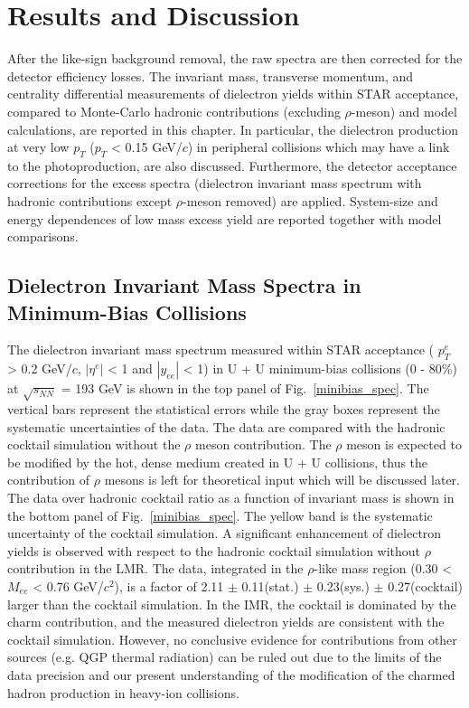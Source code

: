 ﻿\chapter{Results and Discussion}
\label{chap:result}

After the like-sign background removal, the raw spectra are then corrected for the detector efficiency losses. The invariant mass, transverse momentum, and centrality differential measurements of dielectron yields within STAR acceptance, compared to Monte-Carlo hadronic contributions (excluding $\rho$-meson) and model calculations, are reported in this chapter. In particular, the dielectron production at very low $p_{T}$ ($p_{T}$ < 0.15 GeV/$c$) in peripheral collisions which may have a link to the photoproduction, are also discussed. Furthermore, the detector acceptance corrections for the excess spectra (dielectron invariant mass spectrum with hadronic contributions except $\rho$-meson removed) are applied. System-size and energy dependences of low mass excess yield are reported together with model comparisons.

\section{Dielectron Invariant Mass Spectra in Minimum-Bias Collisions}
\label{broadenedrho}
The dielectron invariant mass spectrum measured within STAR acceptance ( $p_{T}^{e}$ > 0.2 GeV/$c$, $|\eta^{e}|$ < 1 and $|y_{ee}|$ < 1) in U + U minimum-bias collisions (0 - 80\%) at $\sqrt{s_{NN}}$ = 193 GeV is shown in the top panel of Fig.~\ref{minibias_spec}. The vertical bars represent the statistical errors while the gray boxes represent the systematic uncertainties of the data. The data are compared with the hadronic cocktail simulation without the $\rho$ meson contribution. The $\rho$ meson is expected to be modified by the hot, dense medium created in U + U collisions, thus the contribution of $\rho$ mesons is left for theoretical input which will be discussed later. The data over hadronic cocktail ratio as a function of invariant mass is shown in the bottom panel of Fig.~\ref{minibias_spec}. The yellow band is the systematic uncertainty of the cocktail simulation. A significant enhancement of dielectron yields is observed with respect to the hadronic cocktail simulation without $\rho$ contribution in the LMR. The data, integrated in the $\rho$-like mass region (0.30 < $M_{ee}$ < 0.76 GeV/$c^{2}$), is a factor of 2.11 $\pm$ 0.11(stat.) $\pm$ 0.23(sys.) $\pm$ 0.27(cocktail) larger than the cocktail simulation. In the IMR, the cocktail is dominated by the charm contribution, and the measured dielectron yields are consistent with the cocktail simulation. However, no conclusive evidence for contributions from other sources (e.g. QGP thermal radiation) can be ruled out due to the limits of the data precision and our present understanding of the modification of the charmed hadron production in heavy-ion collisions.
 
